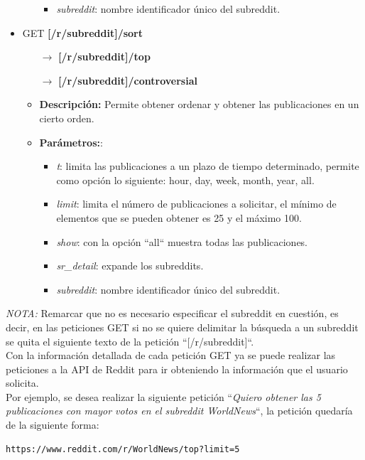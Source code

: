 \documentclass[../../main.tex]{subfiles}
\begin{document}
\begin{itemize}
\begin{itemize}
\begin{itemize}
            \item  \textit{subreddit}: nombre identificador único del subreddit.
        \end{itemize}
    \end{itemize}
    
    \item GET \textbf{[/r/subreddit]/sort}
    \begin{itemize}
        \item[$\rightarrow$] \textbf{[/r/subreddit]/top}
        \item[$\rightarrow$] \textbf{[/r/subreddit]/controversial}
    \end{itemize}
    \begin{itemize}
        \item \textbf{Descripción:} Permite obtener ordenar y obtener las publicaciones en un cierto orden.
        \item \textbf{Parámetros:}:
        \begin{itemize}
            \item  \textit{t}: limita las publicaciones a un plazo de tiempo determinado, permite como opción lo siguiente: hour, day, week, month, year, all.
            
            \item  \textit{limit}: limita el número de publicaciones a solicitar, el mínimo de elementos que se pueden obtener es 25 y el máximo 100.
            
            \item  \textit{show}: con la opción ``all`` muestra todas las publicaciones.
            
            \item  \textit{sr\_detail}: expande los subreddits.
            
            \item  \textit{subreddit}: nombre identificador único del subreddit.
        \end{itemize}
    \end{itemize}
    
\end{itemize}

\textit{NOTA: } Remarcar que no es necesario especificar el subreddit en cuestión, es decir, en las peticiones GET si no se quiere delimitar la búsqueda a un subreddit se quita el siguiente texto de la petición ``[/r/subreddit]``. \\

Con la información detallada de cada petición GET ya se puede realizar las peticiones a la API de Reddit para ir obteniendo la información que el usuario solicita.\\
Por ejemplo, se desea realizar la siguiente petición ``\textit{Quiero obtener las 5 publicaciones con mayor votos en el subreddit WorldNews}``, la petición quedaría de la siguiente forma:
\begin{lstlisting}
https://www.reddit.com/r/WorldNews/top?limit=5
\end{lstlisting}
\end{document}
